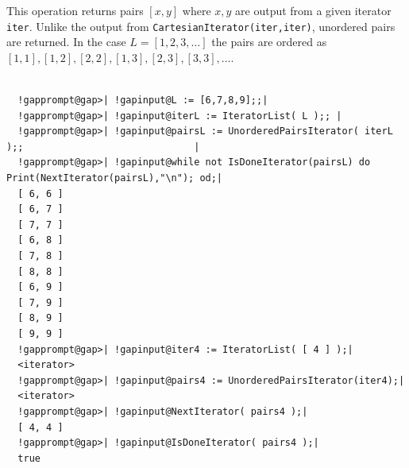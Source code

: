 \documentclass[a4paper,11pt]{report}
\begin{document}
{{{ This operation returns pairs $[x,y]$ where $x,y$ are output from a given iterator \texttt{iter}. Unlike the output from \texttt{CartesianIterator(iter,iter)}, unordered pairs are returned. In the case $L = [1,2,3,\ldots]$ the pairs are ordered as $[1,1],[1,2],[2,2],[1,3],[2,3],[3,3],\ldots$. 

 }

 
\begin{Verbatim}[commandchars=!@|,fontsize=\small,frame=single,label=Example]
  
  !gapprompt@gap>| !gapinput@L := [6,7,8,9];;|
  !gapprompt@gap>| !gapinput@iterL := IteratorList( L );; |
  !gapprompt@gap>| !gapinput@pairsL := UnorderedPairsIterator( iterL );;                              |
  !gapprompt@gap>| !gapinput@while not IsDoneIterator(pairsL) do Print(NextIterator(pairsL),"\n"); od;|
  [ 6, 6 ]
  [ 6, 7 ]
  [ 7, 7 ]
  [ 6, 8 ]
  [ 7, 8 ]
  [ 8, 8 ]
  [ 6, 9 ]
  [ 7, 9 ]
  [ 8, 9 ]
  [ 9, 9 ]
  !gapprompt@gap>| !gapinput@iter4 := IteratorList( [ 4 ] );|
  <iterator>
  !gapprompt@gap>| !gapinput@pairs4 := UnorderedPairsIterator(iter4);|
  <iterator>
  !gapprompt@gap>| !gapinput@NextIterator( pairs4 );|
  [ 4, 4 ]
  !gapprompt@gap>| !gapinput@IsDoneIterator( pairs4 );|
  true
  
\end{Verbatim}
 }

 }

         
\end{document}
